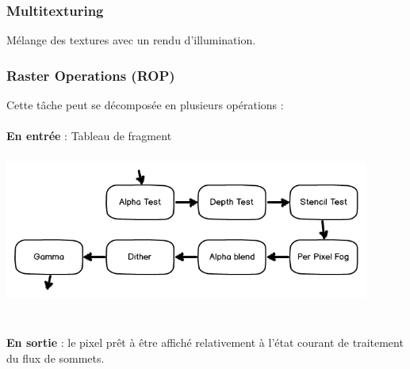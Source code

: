 \subsubsection{Multitexturing}
Mélange des textures avec un rendu d’illumination.

\subsubsection{Raster Operations (ROP)}
Cette tâche peut se décomposée en plusieurs opérations :
\\\\
\textbf{En entrée} : Tableau de fragment
\begin{center}
\includegraphics[width=12cm,height=50mm]{pipeline/images/rasterOp.png}
\end{center}
\textbf{\\En sortie} : le pixel prêt à être affiché relativement à l'état courant de traitement du flux de sommets.
\\

